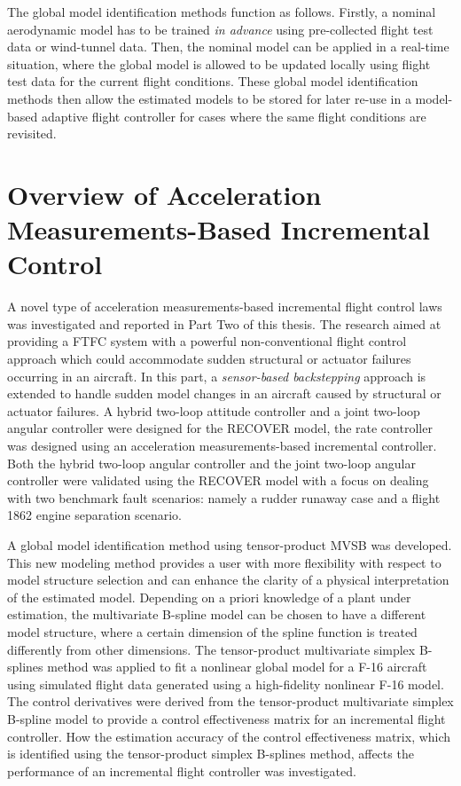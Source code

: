 The global model identification methods function as follows. Firstly, a nominal aerodynamic model has to be trained \textit{in advance} using pre-collected flight test data or wind-tunnel data. Then, the nominal model can be applied in a real-time situation, where the global model is allowed to be updated locally using flight test data for the current flight conditions. These global model identification methods then allow the estimated models to be stored for later re-use in a model-based adaptive flight controller for cases where the same flight conditions are revisited.

\section{Overview of Acceleration Measurements-Based Incremental Control}
\label{sec:02concl}

A novel type of acceleration measurements-based incremental flight control laws was investigated and reported in Part Two of this thesis. The research aimed at providing a \ac{FTFC} system with a powerful non-conventional flight control approach which could accommodate sudden structural or actuator failures occurring in an aircraft. In this part, a \textit{sensor-based backstepping} approach is extended to handle sudden model changes in an aircraft caused by structural or actuator failures. A hybrid two-loop attitude controller and a joint two-loop angular controller were designed for the RECOVER model, the rate controller was designed using an acceleration measurements-based incremental controller. Both the hybrid two-loop angular controller and the joint two-loop angular controller were validated using the RECOVER model with a focus on dealing with two benchmark fault scenarios: namely a rudder runaway case and a flight 1862 engine separation scenario. 

A global model identification method using tensor-product \ac{MVSB} was developed. This new modeling method provides a user with more flexibility with respect to model structure selection and can enhance the clarity of a physical interpretation of the estimated model. Depending on a priori knowledge of a plant under estimation, the multivariate B-spline model can be chosen to have a different model structure, where a certain dimension of the spline function is treated differently from other dimensions. The tensor-product multivariate simplex B-splines method was applied to fit a nonlinear global model for a F-16 aircraft using simulated flight data generated using a high-fidelity nonlinear F-16 model. The control derivatives were derived from the tensor-product multivariate simplex B-spline model to provide a control effectiveness matrix for an incremental flight controller. How the estimation accuracy of the control effectiveness matrix, which is identified using the tensor-product simplex B-splines method, affects the performance of an incremental flight controller was investigated.



